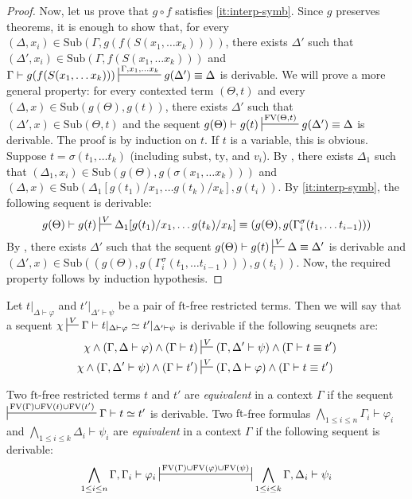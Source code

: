 \documentclass[reqno]{amsart}
\theoremstyle{definition}
\theoremstyle{remark}
\newcommand{\fs}[1]{\mathrm{#1}}
\newcommand{\FV}{\fs{FV}}
\newcommand{\subst}{\fs{subst}}
\newcommand{\ft}{\fs{ft}}
\newcommand{\ty}{\fs{ty}}
\newcommand{\sub}{\fs{Sub}}
\numberwithin{figure}{section}
\begin{document}
\begin{proof}
Now, let us prove that $g \circ f$ satisfies \eqref{it:interp-symb}.
Since $g$ preserves theorems, it is enough to show that, for every $(\Delta,x_i) \in \sub(\Gamma, g(f(S(x_1, \ldots x_k))))$, there exists $\Delta'$ such that $(\Delta',x_i) \in \sub(\Gamma, f(S(x_1, \ldots x_k)))$ and $\Gamma \vdash g(f(S(x_1, \ldots x_k))) \sststile{}{\Gamma, x_1, \ldots x_k} g(\Delta') \equiv \Delta$ is derivable.
We will prove a more general property: for every contexted term $(\Theta,t)$ and every $(\Delta,x) \in \sub(g(\Theta), g(t))$, there exists $\Delta'$ such that $(\Delta',x) \in \sub(\Theta, t)$ and the sequent $g(\Theta) \vdash g(t) \sststile{}{\FV(\Theta,t)} g(\Delta') \equiv \Delta$ is derivable.
The proof is by induction on $t$.
If $t$ is a variable, this is obvious.
Suppose $t = \sigma(t_1, \ldots t_k)$ (including $\subst$, $\ty$, and $v_i$).
By , there exists $\Delta_1$ such that $(\Delta_1,x_i) \in \sub(g(\Theta), g(\sigma(x_1, \ldots x_k)))$ and $(\Delta,x) \in \sub(\Delta_1[g(t_1)/x_1, \ldots g(t_k)/x_k], g(t_i))$.
By \eqref{it:interp-symb}, the following sequent is derivable:
\[ g(\Theta) \vdash g(t) \sststile{}{V} \Delta_1[g(t_1)/x_1, \ldots g(t_k)/x_k] \equiv (g(\Theta), g(\Gamma^\sigma_i(t_1, \ldots t_{i-1}))) \]
By , there exists $\Delta'$ such that the sequent $g(\Theta) \vdash g(t) \sststile{}{V} \Delta \equiv \Delta'$ is derivable and $(\Delta',x) \in \sub((g(\Theta), g(\Gamma^\sigma_i(t_1, \ldots t_{i-1}))), g(t_i))$.
Now, the required property follows by induction hypothesis.
\end{proof}

Let $t|_{\Delta \vdash \varphi}$ and $t'|_{\Delta' \vdash \psi}$ be a pair of $\ft$-free restricted terms.
Then we will say that a sequent $\chi \sststile{}{V} \Gamma \vdash t|_{\Delta \vdash \varphi} \simeq t'|_{\Delta' \vdash \psi}$ is derivable if the following seuqnets are:
\begin{align*}
\chi \land (\Gamma, \Delta \vdash \varphi) \land (\Gamma \vdash t) & \sststile{}{V} (\Gamma, \Delta' \vdash \psi) \land (\Gamma \vdash t \equiv t') \\
\chi \land (\Gamma, \Delta' \vdash \psi) \land (\Gamma \vdash t') & \sststile{}{V} (\Gamma, \Delta \vdash \varphi) \land (\Gamma \vdash t \equiv t')
\end{align*}

Two $\ft$-free restricted terms $t$ and $t'$ are \emph{equivalent} in a context $\Gamma$ if the sequent $\sststile{}{\FV(\Gamma) \cup \FV(t) \cup \FV(t')} \Gamma \vdash t \simeq t'$ is derivable.
Two $\ft$-free formulas $\bigwedge_{1 \leq i \leq n} \Gamma_i \vdash \varphi_i$ and $\bigwedge_{1 \leq i \leq k} \Delta_i \vdash \psi_i$ are \emph{equivalent} in a context $\Gamma$
if the following sequent is derivable:
\[ \bigwedge_{1 \leq i \leq n} \Gamma, \Gamma_i \vdash \varphi_i \ssststile{}{\FV(\Gamma) \cup \FV(\varphi) \cup \FV(\psi)} \bigwedge_{1 \leq i \leq k} \Gamma, \Delta_i \vdash \psi_i \]
\end{document}
